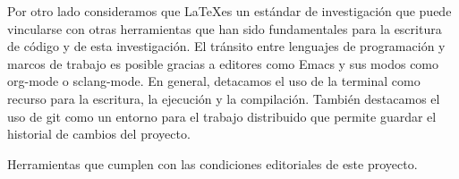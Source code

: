 
Por otro lado consideramos que \LaTeX es un estándar de investigación que puede vincularse con otras herramientas que han sido fundamentales para la escritura de código y de esta investigación. El tránsito entre lenguajes de programación y marcos de trabajo es posible gracias a editores como Emacs y sus modos como org-mode o sclang-mode. En general, detacamos el uso de la terminal como recurso para la escritura, la ejecución y la compilación. También destacamos el uso de \Gls{git} como un entorno para el trabajo distribuido que permite guardar el historial de cambios del proyecto. 


Herramientas que cumplen con las condiciones editoriales de este proyecto. 





\begin{comment} %

\end{comment}




